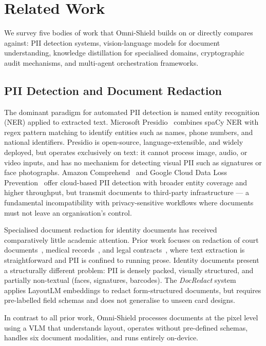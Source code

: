 \section{Related Work}
\label{sec:related}

We survey five bodies of work that Omni-Shield builds on
or directly compares against: PII detection systems,
vision-language models for document understanding,
knowledge distillation for specialised domains,
cryptographic audit mechanisms, and multi-agent
orchestration frameworks.

\subsection{PII Detection and Document Redaction}

The dominant paradigm for automated PII detection is
named entity recognition (NER) applied to extracted text.
Microsoft Presidio~\cite{presidio2020} combines spaCy
NER with regex pattern matching to identify entities
such as names, phone numbers, and national identifiers.
Presidio is open-source, language-extensible, and widely
deployed, but operates exclusively on text: it cannot
process image, audio, or video inputs, and has no
mechanism for detecting visual PII such as signatures
or face photographs.
Amazon Comprehend~\cite{aws_comprehend} and Google Cloud
Data Loss Prevention~\cite{google_dlp} offer cloud-based
PII detection with broader entity coverage and higher
throughput, but transmit documents to third-party
infrastructure --- a fundamental incompatibility with
privacy-sensitive workflows where documents must not
leave an organisation's control.

Specialised document redaction for identity documents
has received comparatively little academic attention.
Prior work focuses on redaction of court
documents~\cite{berg2020}, medical records~\cite{stubbs2015},
and legal contracts~\cite{manor2019}, where text
extraction is straightforward and PII is confined to
running prose.
Identity documents present a structurally different
problem: PII is densely packed, visually structured,
and partially non-textual (faces, signatures, barcodes).
The \textit{DocRedact} system~\cite{ferrando2022} applies
LayoutLM embeddings to redact form-structured documents,
but requires pre-labelled field schemas and does not
generalise to unseen card designs.

In contrast to all prior work, Omni-Shield processes
documents at the pixel level using a VLM that
understands layout, operates without pre-defined schemas,
handles six document modalities, and runs entirely
on-device.

